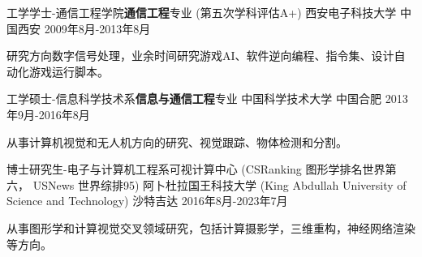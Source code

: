 

\begin{cventries}
	
  \cventry
    {工学学士-通信工程学院\textbf{通信工程}专业 (第五次学科评估A+)} %
    {西安电子科技大学} %
    {中国西安} %
    {2009年8月-2013年8月} %
    {
      \begin{cvitems} %
        \item {研究方向数字信号处理，业余时间研究游戏AI、软件逆向编程、指令集、设计自动化游戏运行脚本。}
      \end{cvitems}
    }

	\cventry
	{工学硕士-信息科学技术系\textbf{信息与通信工程}专业} %
	{中国科学技术大学} %
	{中国合肥} %
	{2013年9月-2016年8月} %
	{
		\begin{cvitems} %
			\item {从事计算机视觉和无人机方向的研究、视觉跟踪、物体检测和分割。}
		\end{cvitems}
	}

	\cventry
	{博士研究生-电子与计算机工程系可视计算中心 (CSRanking 图形学排名世界第六， USNews 世界综排95)} %
	{阿卜杜拉国王科技大学 (King Abdullah University of Science and Technology)} %
	{沙特吉达} %
	{2016年8月-2023年7月} %
	{
		\begin{cvitems} %
			\item {从事图形学和计算视觉交叉领域研究，包括计算摄影学，三维重构，神经网络渲染等方向。}
		\end{cvitems}
	}


\end{cventries}
